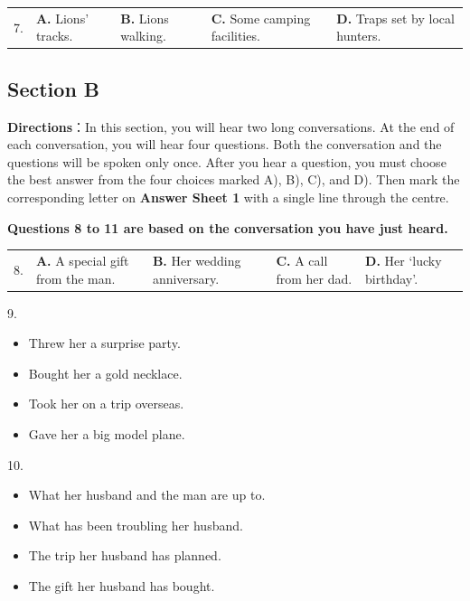 \documentclass[UTF8,11pt]{ctexart}
\begin{document}
\noindent\begin{tabularx}{\linewidth}{@{}lXXXX@{}}7. & \textbf{A.} Lions’ tracks. & \textbf{B.} Lions walking. & \textbf{C.} Some camping facilities. & \textbf{D.} Traps set by local hunters.\\\end{tabularx}\par

\subsection*{\textbf{Section B}}


\textbf{Directions}：In this section, you will hear two long conversations. At the end of each conversation, you will hear four questions. Both the conversation and the questions will be spoken only once. After you hear a question, you must choose the best answer from the four choices marked A), B), C), and D). Then mark the corresponding letter on\textbf{ Answer Sheet 1} with a single line through the centre.


\textbf{Questions 8 to 11 are based on the conversation you have just heard.}


\noindent\begin{tabularx}{\linewidth}{@{}lXXXX@{}}8. & \textbf{A.} A special gift from the man. & \textbf{B.} Her wedding anniversary. & \textbf{C.} A call from her dad. & \textbf{D.} Her ‘lucky birthday’.\\\end{tabularx}\par

9.


\begin{itemize}[leftmargin=2em,itemsep=.2em,topsep=.4em]\item[A.] Threw her a surprise party.
\item[C.] Bought her a gold necklace.
\end{itemize}

\begin{itemize}[leftmargin=2em,itemsep=.2em,topsep=.4em]\item[B.] Took her on a trip overseas.
\item[D.] Gave her a big model plane.
\end{itemize}

10.


\begin{itemize}[leftmargin=2em,itemsep=.2em,topsep=.4em]\item[A.] What her husband and the man are up to.
\item[B.] What has been troubling her husband.
\item[C.] The trip her husband has planned.
\item[D.] The gift her husband has bought.
\end{itemize}
\end{document}
